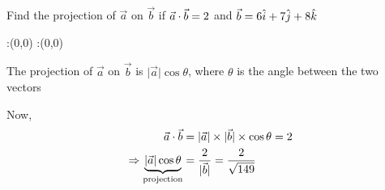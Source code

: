 


\question Find the projection of $\vec{a}$ on $\vec{b}$ if $\vec{a}\cdot\vec{b} = 2$ 
and $\vec{b} = 6\hat{i} + 7\hat{j} + 8\hat{k}$ 


\watchout

\ifprintanswers
  \begin{marginfigure}
      :(0,0)
      :(0,0)
    \figdrawbegin{}
      \figdrawline [100,101]
    \figdrawend
    \figvisu{\figBoxA}{}{%
    }
    \centerline{\box\figBoxA}
  \end{marginfigure}
\fi 

\begin{solution}
	The projection of $\vec{a}$ on $\vec{b}$ is $\vert\vec{a}\vert\cos\theta$, where $\theta$ 
	is the angle between the two vectors
	
	Now, \begin{align}
		\vec{a}\cdot\vec{b} &= \vert\vec{a}\vert\times\vert\vec{b}\vert\times\cos\theta = 2 \\
		\Rightarrow \underbrace{\vert\vec{a}\vert\cos\theta}_{\text{projection}} 
		&= \dfrac{2}{\vert\vec{b}\vert} = \dfrac{2}{\sqrt{149}} 
	\end{align}
\end{solution}


